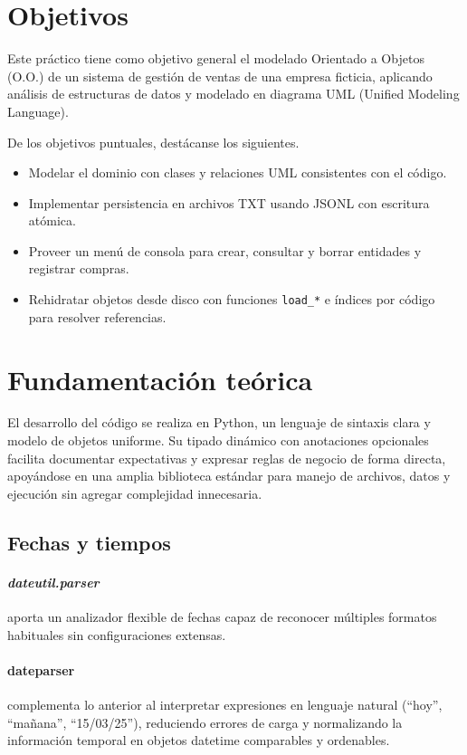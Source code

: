 \documentclass[11pt]{article}
\begin{document}
\section{Objetivos}
Este práctico tiene como objetivo general el modelado Orientado a Objetos (O.O.) de un sistema de gestión de ventas de una empresa ficticia, aplicando análisis de estructuras de datos y modelado en diagrama UML (Unified Modeling Language).

De los objetivos puntuales, destácanse los siguientes.
\begin{itemize}
    \item Modelar el dominio con clases y relaciones UML consistentes con el código.
    \item Implementar persistencia en archivos TXT usando JSONL con escritura atómica.
    \item Proveer un menú de consola para crear, consultar y borrar entidades y registrar compras.
    \item Rehidratar objetos desde disco con funciones \texttt{load\_*} e índices por código para resolver referencias.
\end{itemize}


\section{Fundamentación teórica} \label{fundamentos}

El desarrollo del código se realiza en Python, un lenguaje de sintaxis clara y modelo de objetos uniforme. Su tipado dinámico con anotaciones opcionales facilita documentar expectativas y expresar reglas de negocio de forma directa, apoyándose en una amplia biblioteca estándar para manejo de archivos, datos y ejecución sin agregar complejidad innecesaria.

\subsection{Fechas y tiempos}

\paragraph{\textbf{\textit{dateutil.parser}}} aporta un analizador flexible de fechas capaz de reconocer múltiples formatos habituales sin configuraciones extensas.
\paragraph{\textbf{dateparser}} complementa lo anterior al interpretar expresiones en lenguaje natural  (“hoy”, \linebreak “mañana”, “15/03/25”), reduciendo errores de carga y normalizando la información temporal en objetos datetime comparables y ordenables.
\end{document}
